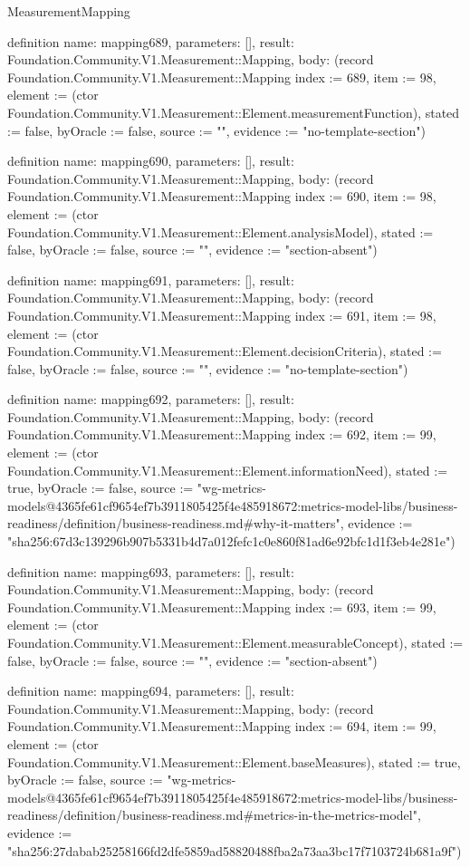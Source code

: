 \begin{lexlean}{MeasurementMapping}
\begin{semanticmodule}
definition{
  name: mapping689,
  parameters: [],
  result: Foundation.Community.V1.Measurement::Mapping,
  body: (record Foundation.Community.V1.Measurement::Mapping {index := 689, item := 98, element := (ctor Foundation.Community.V1.Measurement::Element.measurementFunction), stated := false, byOracle := false, source := "", evidence := "no-template-section"})
}

definition{
  name: mapping690,
  parameters: [],
  result: Foundation.Community.V1.Measurement::Mapping,
  body: (record Foundation.Community.V1.Measurement::Mapping {index := 690, item := 98, element := (ctor Foundation.Community.V1.Measurement::Element.analysisModel), stated := false, byOracle := false, source := "", evidence := "section-absent"})
}

definition{
  name: mapping691,
  parameters: [],
  result: Foundation.Community.V1.Measurement::Mapping,
  body: (record Foundation.Community.V1.Measurement::Mapping {index := 691, item := 98, element := (ctor Foundation.Community.V1.Measurement::Element.decisionCriteria), stated := false, byOracle := false, source := "", evidence := "no-template-section"})
}

definition{
  name: mapping692,
  parameters: [],
  result: Foundation.Community.V1.Measurement::Mapping,
  body: (record Foundation.Community.V1.Measurement::Mapping {index := 692, item := 99, element := (ctor Foundation.Community.V1.Measurement::Element.informationNeed), stated := true, byOracle := false, source := "wg-metrics-models@4365fe61cf9654ef7b3911805425f4e485918672:metrics-model-libs/business-readiness/definition/business-readiness.md#why-it-matters", evidence := "sha256:67d3c139296b907b5331b4d7a012fefc1c0e860f81ad6e92bfc1d1f3eb4e281e"})
}

definition{
  name: mapping693,
  parameters: [],
  result: Foundation.Community.V1.Measurement::Mapping,
  body: (record Foundation.Community.V1.Measurement::Mapping {index := 693, item := 99, element := (ctor Foundation.Community.V1.Measurement::Element.measurableConcept), stated := false, byOracle := false, source := "", evidence := "section-absent"})
}

definition{
  name: mapping694,
  parameters: [],
  result: Foundation.Community.V1.Measurement::Mapping,
  body: (record Foundation.Community.V1.Measurement::Mapping {index := 694, item := 99, element := (ctor Foundation.Community.V1.Measurement::Element.baseMeasures), stated := true, byOracle := false, source := "wg-metrics-models@4365fe61cf9654ef7b3911805425f4e485918672:metrics-model-libs/business-readiness/definition/business-readiness.md#metrics-in-the-metrics-model", evidence := "sha256:27dabab25258166fd2dfe5859ad58820488fba2a73aa3bc17f7103724b681a9f"})
}


\end{semanticmodule}
\end{lexlean}

